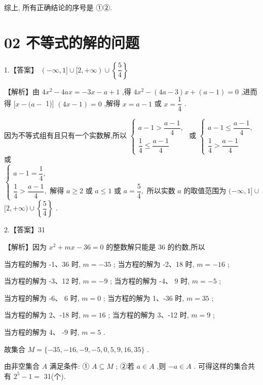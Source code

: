 \documentclass[10pt]{article}
\begin{document}
综上, 所有正确结论的序号是 ①②.

\section*{02 不等式的解的问题}

1.【答案】 $\left( {-\infty ,1\rbrack \cup \lbrack 2, + \infty }\right)  \cup  \left\{  \dfrac{5}{4}\right\}$

【解析】由 $4{x}^{2} - {4ax} =  - {3x} - a + 1$ ,得 $4{x}^{2} - \left( {{4a} - 3}\right) x + \left( {a - 1}\right)  = 0$ ,进而得 $\lbrack x - (a -$ 1)] $\left( {{4x} - 1}\right)  = 0$ ,解得 $x = a - 1$ 或 $x = \dfrac{1}{4}$ .

因为不等式组有且只有一个实数解,所以 $\left\{  \begin{array}{l} a - 1 > \dfrac{a - 1}{4}, \\  \dfrac{1}{4} \leq  \dfrac{a - 1}{4} \end{array}\right.$ 或 $\left\{  \begin{array}{l} a - 1 \leq  \dfrac{a - 1}{4}, \\  \dfrac{1}{4} > \dfrac{a - 1}{4} \end{array}\right.$ 或 $\left\{  \begin{array}{l} a - 1 = \dfrac{1}{4}, \\  \dfrac{1}{4} > \dfrac{a - 1}{4},\text{ 解得 }a \geq  2\text{ 或 }a \leq  1\text{ 或 }a = \dfrac{5}{4},\text{ 所以实数 }a\text{ 的取值范围为 }( - \infty ,1\rbrack  \cup   \end{array}\right.$  $\lbrack 2, + \infty ) \cup  \left\{  \dfrac{5}{4}\right\}$ .

2.【答案】31

【解析】因为 ${x}^{2} + {mx} - {36} = 0$ 的整数解只能是 36 的约数,所以

当方程的解为 -1、36 时, $m =  - {35}$ ; 当方程的解为 -2、18 时, $m =  - {16}$ ;

当方程的解为 -3、12 时, $m =  - 9$ ; 当方程的解为 -4、 9 时, $m =  - 5$ ;

当方程的解为 -6、 6 时, $m = 0$ ; 当方程的解为 1、-36 时, $m = {35}$ ;

当方程的解为 2、-18 时, $m = {16}$ ; 当方程的解为 3、-12 时, $m = 9$ ;

当方程的解为 4、 -9 时, $m = 5$ .

故集合 $M = \{  - {35}, - {16}, - 9, - 5,0,5,9,{16},{35}\}$ .

由非空集合 $A$ 满足条件: ① $A \subseteq  M$ ; ②若 $a \in  A$ ,则 $- a \in  A$ . 可得这样的集合共有 ${2}^{5} - 1 =$ 31(个).
\end{document}
